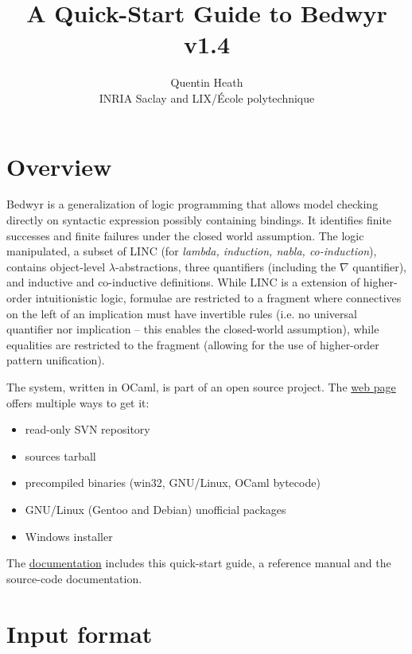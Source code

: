 \documentclass[a4paper]{article} %
\title{{\Huge A Quick-Start Guide to Bedwyr v1.4}}
\author{Quentin Heath\\
        INRIA Saclay and LIX/\'Ecole polytechnique}
\begin{document}
\maketitle

\section{Overview}

Bedwyr is a generalization of logic programming that allows model checking
directly on syntactic expression possibly containing bindings.  It identifies
finite successes and finite failures under the closed world assumption.  The
logic manipulated, a subset of LINC (for \emph{lambda, induction, nabla,
co-induction}), contains object-level $\lambda$-abstractions, three quantifiers
(including the $\nabla$ quantifier), and inductive and co-inductive
definitions.  While LINC is a extension of higher-order intuitionistic logic,
formulae are restricted to a fragment where connectives on the left of an
implication must have invertible rules (i.e. no universal quantifier nor
implication -- this enables the closed-world assumption), while equalities are
restricted to the \Ll{} fragment (allowing for the use of higher-order pattern
unification).

The system, written in OCaml, is part of an open source project.
The \href{http://slimmer.gforge.inria.fr/bedwyr/#download}{web page}
offers multiple ways to get it:
\begin{itemize}
  \item read-only SVN repository
  \item sources tarball
  \item precompiled binaries (win32, GNU/Linux, OCaml bytecode)
  \item GNU/Linux (Gentoo and Debian) unofficial packages
  \item Windows installer
\end{itemize}

The \href{http://slimmer.gforge.inria.fr/bedwyr/#documentation}{documentation}
includes this quick-start guide, a reference manual and the source-code
documentation.

\section{Input format}
\end{document}
